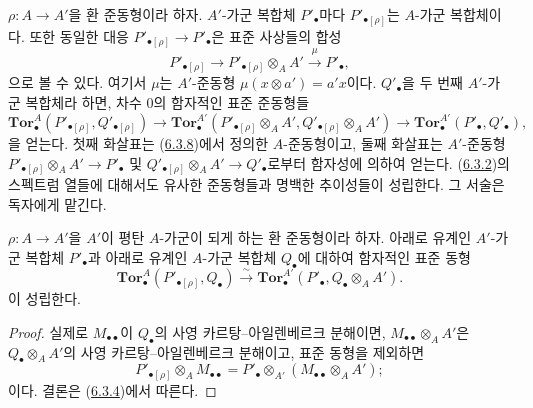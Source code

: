 \begin{env}[6.3.10]
\label{III.6.3.10-fr}
$\rho:A\to A'$을 환 준동형이라 하자. $A'$-가군 복합체
$P'_\bullet$마다 $P'_{\bullet[\rho]}$는 $A$-가군 복합체이다. 또한
동일한 대응 $P'_{\bullet[\rho]}\to P'_\bullet$은 표준 사상들의 합성
\[
  P'_{\bullet[\rho]}\longrightarrow
  P'_{\bullet[\rho]}\otimes_A A'
  \xrightarrow{\mu}P'_\bullet,
\]
으로 볼 수 있다. 여기서 $\mu$는 $A'$-준동형
$\mu(x\otimes a')=a'x$이다. $Q'_\bullet$을 두 번째 $A'$-가군
복합체라 하면, 차수 0의 함자적인 표준 준동형들
\[
  \mathbf{Tor}_\bullet^A(P'_{\bullet[\rho]},Q'_{\bullet[\rho]})
  \longrightarrow
  \mathbf{Tor}_\bullet^{A'}
  (P'_{\bullet[\rho]}\otimes_A A',Q'_{\bullet[\rho]}\otimes_A A')
  \longrightarrow
  \mathbf{Tor}_\bullet^{A'}(P'_\bullet,Q'_\bullet),
  \tag{6.3.10.1}\label{III.6.3.10.1.fr}
\]
을 얻는다. 첫째 화살표는
(\hyperref[III.6.3.8-fr]{6.3.8})에서 정의한 $A$-준동형이고, 둘째
화살표는 $A'$-준동형
$P'_{\bullet[\rho]}\otimes_A A'\to P'_\bullet$ 및
$Q'_{\bullet[\rho]}\otimes_A A'\to Q'_\bullet$로부터 함자성에 의하여
얻는다. (\hyperref[III.6.3.2-fr]{6.3.2})의 스펙트럼 열들에 대해서도
유사한 준동형들과 명백한 추이성들이 성립한다. 그 서술은 독자에게
맡긴다.
\end{env}

\begin{proposition}[6.3.11]
\label{III.6.3.11-fr}
$\rho:A\to A'$을 $A'$이 평탄 $A$-가군이 되게 하는 환 준동형이라
하자. 아래로 유계인 $A'$-가군 복합체 $P'_\bullet$과 아래로 유계인
$A$-가군 복합체 $Q_\bullet$에 대하여 함자적인 표준 동형
\[
  \mathbf{Tor}_\bullet^A(P'_{\bullet[\rho]},Q_\bullet)
  \xrightarrow{\sim}
  \mathbf{Tor}_\bullet^{A'}(P'_\bullet,Q_\bullet\otimes_A A').
  \tag{6.3.11.1}\label{III.6.3.11.1.fr}
\]
이 성립한다.
\end{proposition}

\begin{proof}
실제로 $M_{\bullet\bullet}$이 $Q_\bullet$의 사영
카르탕--아일렌베르크 분해이면,
$M_{\bullet\bullet}\otimes_A A'$은 $Q_\bullet\otimes_A A'$의 사영
카르탕--아일렌베르크 분해이고, 표준 동형을 제외하면
\[
  P'_{\bullet[\rho]}\otimes_A M_{\bullet\bullet}
  =P'_\bullet\otimes_{A'}(M_{\bullet\bullet}\otimes_A A');
\]
이다. 결론은 (\hyperref[III.6.3.4-fr]{6.3.4})에서 따른다.
\end{proof}

